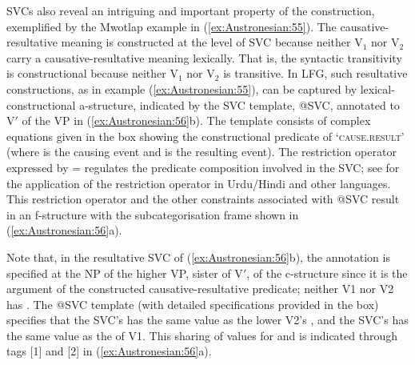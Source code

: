 \documentclass[output=paper,chinesefont]{../langscibook}
\begin{document}
SVCs also reveal an intriguing and important property of the construction, exemplified by the Mwotlap example in (\ref{ex:Austronesian:55}). The causative-resultative meaning is constructed at the level of SVC because neither V$_1$ nor V$_2$ carry a causative-resultative meaning lexically. That is, the syntactic transitivity is constructional because neither V$_1$ nor V$_2$ is transitive. In LFG, such resultative constructions, as in example (\ref{ex:Austronesian:55}), can be captured by lexical-constructional a-structure, indicated by the SVC template, @SVC, annotated to V$'$ of the VP in (\ref{ex:Austronesian:56}b). The template consists of complex equations given in the box showing the constructional predicate of `\textsc{cause.result}' (where  is the causing event and  is the resulting event). The restriction operator expressed by \UP\restrict{\PRED}\restrict{\GF}=\DOWN\restrict{\PRED}\restrict{\GF} \citep{kaplanwedekind93} regulates the predicate composition involved in the SVC; see  \citet{buttetal03} for the application of the restriction operator in Urdu/Hindi and other languages. This restriction operator and the other constraints associated with @SVC result in an f-structure with the subcategorisation frame shown in (\ref{ex:Austronesian:56}a).


Note that, in the resultative SVC of (\ref{ex:Austronesian:56}b), the \OBJ annotation is specified at the NP of the higher VP, sister of V$'$, of the c-structure since it is the \OBJ argument of the constructed causative-resultative predicate; neither V1 nor V2 has \OBJ. The @SVC template (with detailed specifications provided in the box) specifies that the SVC's \OBJ has the same value as the lower V2's \SUBJ, and the SVC's \SUBJ has the same value as the \SUBJ of V1. This sharing of values for \SUBJ and \OBJ is indicated through tags [1] and [2] in (\ref{ex:Austronesian:56}a). 
\end{document}

